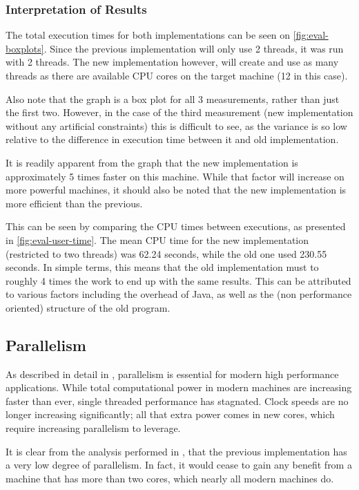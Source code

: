\subsubsection{Interpretation of Results}
The total execution times for both implementations can be seen on \autoref{fig:eval-boxplots}. Since the previous implementation will only use 2 threads, it was run with 2 threads. 
The new implementation however, will create and use as many threads as there are available CPU cores on the target machine (12 in this case).

Also note that the graph is a box plot for all 3 measurements, rather than just the first two. However, in the case of the third measurement (new implementation without any artificial constraints) this is difficult to see, as the variance is so low relative to the difference in execution time between it and old implementation.

It is readily apparent from the graph that the new implementation is approximately 5 times faster on this machine. While that factor will increase on more powerful machines, it should also be noted that the new implementation is more efficient than the previous.

This can be seen by comparing the CPU times between executions, as presented in \autoref{fig:eval-user-time}. The mean CPU time for the new implementation (restricted to two threads) was 62.24 seconds, while the old one used 230.55 seconds. In simple terms, this means that the old implementation must to roughly 4 times the work to end up with the same results. This can be attributed to various factors including the overhead of Java, as well as the (non performance oriented) structure of the old program. 

\subsection{Parallelism}
As described in detail in , parallelism is essential for modern high performance applications. While total computational power in modern machines are increasing faster than ever, single threaded performance has stagnated. Clock speeds are no longer increasing significantly; all that extra power comes in new cores, which require increasing parallelism to leverage. 

It is clear from the analysis performed in , that the previous implementation has a very low degree of parallelism. In fact, it would cease to gain any benefit from a machine that has more than two cores, which nearly all modern machines do. 

